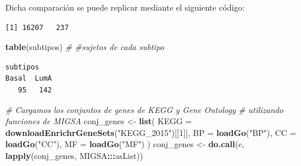 \documentclass[12pt,twoside]{reedthesis}
\newenvironment{Shaded}{\begin{snugshade}}{\end{snugshade}}
\newcommand{\CommentTok}[1]{\textcolor[rgb]{0.56,0.35,0.01}{\textit{#1}}}
\newcommand{\DataTypeTok}[1]{\textcolor[rgb]{0.13,0.29,0.53}{#1}}
\newcommand{\DecValTok}[1]{\textcolor[rgb]{0.00,0.00,0.81}{#1}}
\newcommand{\KeywordTok}[1]{\textcolor[rgb]{0.13,0.29,0.53}{\textbf{#1}}}
\newcommand{\NormalTok}[1]{#1}
\newcommand{\OperatorTok}[1]{\textcolor[rgb]{0.81,0.36,0.00}{\textbf{#1}}}
\newcommand{\StringTok}[1]{\textcolor[rgb]{0.31,0.60,0.02}{#1}}
\begin{document}
Dicha comparación se puede replicar mediante el siguiente código:
\begin{Shaded}
\end{Shaded}
\begin{verbatim}
[1] 16207   237
\end{verbatim}
\begin{Shaded}
\begin{Highlighting}[]
\KeywordTok{table}\NormalTok{(subtipos) }\CommentTok{# #sujetos de cada subtipo}
\end{Highlighting}
\end{Shaded}
\begin{verbatim}
subtipos
Basal  LumA 
   95   142 
\end{verbatim}
\begin{Shaded}
\begin{Highlighting}[]
\CommentTok{# Cargamos los conjuntos de genes de KEGG y Gene Ontology}
\CommentTok{# utilizando funciones de MIGSA}
\NormalTok{conj_genes <-}\StringTok{ }\KeywordTok{list}\NormalTok{(}
  \DataTypeTok{KEGG =} \KeywordTok{downloadEnrichrGeneSets}\NormalTok{(}\StringTok{"KEGG_2015"}\NormalTok{)[[}\DecValTok{1}\NormalTok{]],}
  \DataTypeTok{BP =} \KeywordTok{loadGo}\NormalTok{(}\StringTok{"BP"}\NormalTok{),}
  \DataTypeTok{CC =} \KeywordTok{loadGo}\NormalTok{(}\StringTok{"CC"}\NormalTok{),}
  \DataTypeTok{MF =} \KeywordTok{loadGo}\NormalTok{(}\StringTok{"MF"}\NormalTok{)}
\NormalTok{)}
\NormalTok{conj_genes <-}\StringTok{ }\KeywordTok{do.call}\NormalTok{(c, }\KeywordTok{lapply}\NormalTok{(conj_genes, MIGSA}\OperatorTok{:::}\NormalTok{asList))}
\end{Highlighting}
\end{Shaded}
\begin{Shaded}
\end{Shaded}
\end{document}
